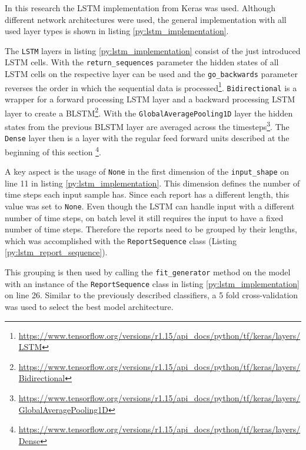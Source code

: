In this research the \ac{LSTM} implementation from Keras was used.
Although different network architectures were used, the general implementation with all used layer types is shown in listing \ref{py:lstm_implementation}.

The \texttt{LSTM} layers in listing \ref{py:lstm_implementation} consist of the just introduced \ac{LSTM} cells.
With the \texttt{return\_sequences} parameter the hidden states of all \ac{LSTM} cells on the respective layer can be used and the \texttt{go\_backwards} parameter reverses the order in which the sequential data is processed\footnote{\url{https://www.tensorflow.org/versions/r1.15/api_docs/python/tf/keras/layers/LSTM}}.
\texttt{Bidirectional} is a wrapper for a forward processing \ac{LSTM} layer and a backward processing \ac{LSTM} layer to create a \ac{BLSTM}\footnote{\url{https://www.tensorflow.org/versions/r1.15/api_docs/python/tf/keras/layers/Bidirectional}}.
With the \texttt{GlobalAveragePooling1D} layer the hidden states from the previous \ac{BLSTM} layer are averaged across the timesteps\footnote{\url{https://www.tensorflow.org/versions/r1.15/api_docs/python/tf/keras/layers/GlobalAveragePooling1D}}.
The \texttt{Dense} layer then is a layer with the regular feed forward units described at the beginning of this section \footnote{\url{https://www.tensorflow.org/versions/r1.15/api_docs/python/tf/keras/layers/Dense}}.

A key aspect is the usage of \texttt{None} in the first dimension of the \texttt{input\_shape} on line 11 in listing \ref{py:lstm_implementation}.
This dimension defines the number of time steps each input sample has.
Since each report has a different length, this value was set to \texttt{None}.
Even though the \ac{LSTM} can handle input with a different number of time steps, on batch level it still requires the input to have a fixed number of time steps.
Therefore the reports need to be grouped by their lengths, which was accomplished with the \texttt{ReportSequence} class (Listing \ref{py:lstm_report_sequence}).

This grouping is then used by calling the \texttt{fit\_generator} method on the model with an instance of the \texttt{ReportSequence} class in listing \ref{py:lstm_implementation} on line 26.
Similar to the previously described classifiers, a 5 fold cross-validation was used to select the best model architecture.

